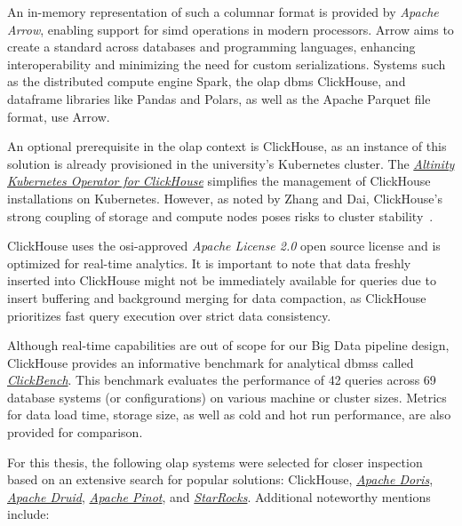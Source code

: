 An in-memory representation of such a columnar format is provided by \textit{Apache Arrow}, enabling support for \ac{simd} operations in modern processors.
Arrow aims to create a standard across databases and programming languages, enhancing interoperability and minimizing the need for custom serializations.
Systems such as the distributed compute engine Spark, the \ac{olap} \ac{dbms} ClickHouse, and dataframe libraries like Pandas and Polars, as well as the Apache Parquet file format, use Arrow.

An optional prerequisite in the \ac{olap} context is ClickHouse, as an instance of this solution is already provisioned in the university's Kubernetes cluster.
The \href{https://altinity.com/kubernetes-operator/}{\textit{Altinity Kubernetes Operator for ClickHouse}} simplifies the management of ClickHouse installations on Kubernetes.
However, as noted by Zhang and Dai, ClickHouse's strong coupling of storage and compute nodes poses risks to cluster stability~\cite{Zhang2023}.

ClickHouse uses the \ac{osi}-approved \textit{Apache License 2.0} open source license and is optimized for real-time analytics.
It is important to note that data freshly inserted into ClickHouse might not be immediately available for queries due to insert buffering and background merging for data compaction, as ClickHouse prioritizes fast query execution over strict data consistency.

Although real-time capabilities are out of scope for our Big Data pipeline design, ClickHouse provides an informative benchmark for analytical \acp{dbms} called \href{https://benchmark.clickhouse.com/}{\textit{ClickBench}}.
This benchmark evaluates the performance of 42 queries across 69 database systems (or configurations) on various machine or cluster sizes.
Metrics for data load time, storage size, as well as cold and hot run performance, are also provided for comparison.

For this thesis, the following \ac{olap} systems were selected for closer inspection based on an extensive search for popular solutions: ClickHouse, \href{https://doris.apache.org/}{\textit{Apache Doris}}, \href{https://druid.apache.org/}{\textit{Apache Druid}}, \href{https://pinot.apache.org/}{\textit{Apache Pinot}}, and \href{https://starrocks.io/}{\textit{StarRocks}}.
Additional noteworthy mentions include:

